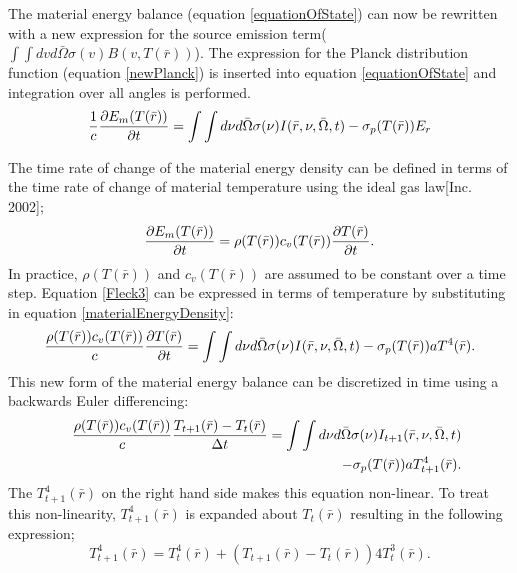 	The material energy balance (equation \ref{equationOfState}) can now be rewritten with a new expression for the source emission term($\int\int{dv}d\bar{\Omega}\sigma(v)B(v,T(\bar{r}))$). The expression for the Planck distribution function (equation \ref{newPlanck}) is inserted into equation \ref{equationOfState} and integration over all angles is performed.
	\begin{equation}
	\label{Fleck3}
	{1\over{c}}{\partial{E_m(T(\bar{r}))}\over{\partial{t}}}={\int\int{d\nu}{d\bar{\Omega}}\sigma(\nu)I(\bar{r},\nu,\bar{\Omega},t)-\sigma_p(T(\bar{r})){E_r}}
	\end{equation}
	
	The time rate of change of the material energy density can be defined in terms of the time rate of change of material temperature using the ideal gas law[Inc. 2002];
	\begin{equation}
	\label{materialEnergyDensity}
	{\partial{E_m(T(\bar{r}))}\over{\partial{t}}}={\rho(T(\bar{r})){c_v(T(\bar{r})){\partial{T(\bar{r})}\over{\partial{t}}}}}.
	\end{equation}
	In practice,  $\rho(T(\bar{r}))$ and $c_v(T(\bar{r}))$ are assumed to be constant over a time step. Equation \ref{Fleck3} can be expressed in terms of temperature by substituting in equation \ref{materialEnergyDensity}: 
	\begin{equation}
	\label{Fleck4}
	{\rho(T(\bar{r})){c_v(T(\bar{r}))}\over{c}}{\partial{T(\bar{r})}\over{\partial{t}}}={\int\int{d\nu}{d\bar{\Omega}}\sigma(\nu)I(\bar{r},\nu,\bar{\Omega},t)-\sigma_p(T(\bar{r})){aT^4(\bar{r})}}.
	\end{equation}
	This new form of the material energy balance can be discretized in time using a backwards Euler differencing:
	\begin{eqnarray}
	\label{Fleck5}
	&&{\rho(T(\bar{r})){c_v(T(\bar{r}))}\over{c}}{{T_{t+1}(\bar{r})-T_t(\bar{r})}\over{\Delta{t}}}={\int\int{d\nu}{d\bar{\Omega}}\sigma(\nu)I_{t+1}(\bar{r},\nu,\bar{\Omega},t)}\nonumber \\&& -{\sigma_p(T(\bar{r})){aT_{t+1}^4(\bar{r})}}.
	\end{eqnarray}
	The $T^4_{t+1}(\bar{r})$ on the right hand side makes this equation non-linear. To treat this non-linearity, $T^4_{t+1}(\bar{r})$ is expanded about $T_t(\bar{r})$ resulting in the following expression;
	\begin{equation}
	\label{tempExp4}
	T_{t+1}^4(\bar{r})=T_t^4(\bar{r})+(T_{t+1}(\bar{r})-T_t(\bar{r}))4T^3_t(\bar{r}).
	\end{equation}

